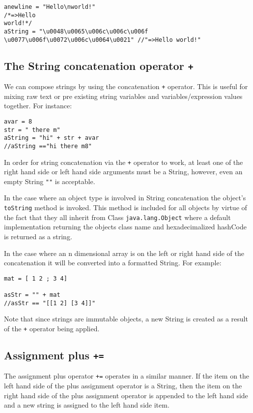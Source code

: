 \documentclass[conc-doc]{subfiles}
\begin{document}
\begin{lstlisting}
anewline = "Hello\nworld!"
/*=>Hello
world!*/
aString = "\u0048\u0065\u006c\u006c\u006f \u0077\u006f\u0072\u006c\u0064\u0021" //"=>Hello world!"
\end{lstlisting}

\subsection{The String concatenation operator \lstinline!+!}
\label{subsec:StringConcat}
We can compose strings by using the concatenation \lstinline{+} operator. This is useful for mixing raw text or pre existing string variables and variables/expression values together. For instance:

\begin{lstlisting}
avar = 8
str = " there m"
aString = "hi" + str + avar
//aString =="hi there m8"
\end{lstlisting}

In order for string concatenation via the \lstinline{+} operator to work, at least one of the right hand side or left hand side arguments must be a String, however, even an empty String \lstinline{""} is acceptable.

In the case where an object type is involved in String concatenation the object's \lstinline{toString} method is invoked. This method is included for all objects by virtue of the fact that they all inherit from Class \lstinline{java.lang.Object} where a default implementation returning the objects class name and hexadecimalized hashCode is returned as a string.

In the case where an n dimensional array is on the left or right hand side of the concatenation it will be converted into a formatted String. For example:
\begin{lstlisting}
mat = [ 1 2 ; 3 4]

asStr = "" + mat
//asStr == "[[1 2] [3 4]]"
\end{lstlisting}

Note that since strings are immutable objects, a new String is created as a result of the \lstinline{+} operator being applied.

\subsection{Assignment plus \lstinline!+=!}
The assignment plus operator \lstinline{+=} operates in a similar manner. If the item on the left hand side of the plus assignment operator is a String, then the item on the right hand side of the plus assignment operator is appended to the left hand side and a new string is assigned to the left hand side item. 
\end{document}
